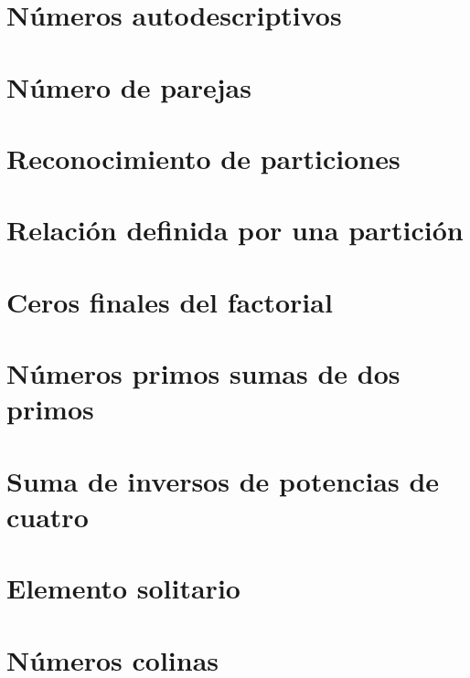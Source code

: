 \documentclass[a4paper,12pt,twoside]{book}
\begin{document}
 
\chapter{Números autodescriptivos}

\chapter{Número de parejas}

\chapter{Reconocimiento de particiones}

\chapter{Relación definida por una partición}

\chapter{Ceros finales del factorial}

 
\chapter{Números primos sumas de dos primos}

\chapter{Suma de inversos de potencias de cuatro}

\chapter{Elemento solitario}

\chapter{Números colinas}
\end{document}
